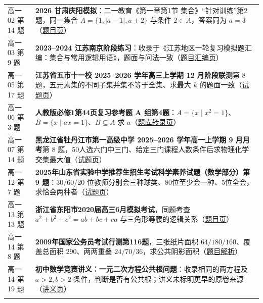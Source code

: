 \documentclass[a4paper,11pt]{article}
\begin{document}
\begin{xltabular}{\textwidth}{@{}>{\raggedright\arraybackslash}p{6.55cm}>{\raggedright\arraybackslash}p{8.60cm}@{}}
高一02 第 14 题 & \textbf{2026 甘肃庆阳模拟}：二一教育《第一章第1节 集合》``针对训练''第2题，同一集合 \(A=\allowbreak \{1,\allowbreak \lvert a-1\rvert,a+\allowbreak 2\}\) 与条件 \(2\in A\)，答案同为 \(a=\allowbreak 3\)（\href{https://zy.21cnjy.com/26331932}{题目页}） \\ \addlinespace[1pt]
高一03 第 9 题 & \textbf{2023--2024 江苏南京阶段练习}：收录于《江苏地区一轮复习模拟题汇编：集合与常用逻辑用语》，题面与问法一致（\href{https://wenku.baidu.com/view/8a489f9272eeaeaad1f34693daef5ef7ba0d12a7.html}{题目汇编页}） \\ \addlinespace[1pt]
高一05 第 17 题 & \textbf{江苏省五市十一校 2025--2026 学年高三上学期 12 月阶段联测}第 8 题，五元素集的不同子集并集不等于全集、求最大 \(k\) 的题面一致（\href{https://www.zxxk.com/soft/55509852.html}{试题页}） \\ \addlinespace[1pt]
高一06 第 3 题 & \textbf{人教版必修1第44页复习参考题 A 组第4题}：\(A=\allowbreak \{x\mid\allowbreak  x^2=\allowbreak 1\}\)、\(B=\allowbreak \{x\mid\allowbreak  ax=\allowbreak 1\}\)、\(B\subseteq\allowbreak  A\) 求 \(a\)（\href{https://easylearn.baidu.com/edu-page/tiangong/questiondetail?id=1721456871855136287}{题库转录页}） \\ \addlinespace[1pt]
高一07 第 14 题 & \textbf{黑龙江省牡丹江市第一高级中学 2025--2026 学年高一上学期 9 月月考}第 8 题，50人选六门中三门、给定三门课程人数条件后求物理化学交集最大值（\href{https://zy.21cnjy.com/23974770}{试题页}） \\ \addlinespace[1pt]
高一12 第 7 题 & \textbf{2025年山东省实验中学推荐生招生考试科学素养试题（数学部分）第 9 题}：30/60/20 位教师分别会三种球类、80位至少会一种、5位全会，求恰会两种者（\href{https://zujuan.xkw.com/11p3421572.html}{试题页}） \\ \addlinespace[1pt]
高一13 第 13 题 & \textbf{浙江省东阳市2020届高三6月模拟考试}，同题考查 \(a^2+b^2+c^2=ab+bc+ca\) 与三角形等腰的逻辑关系（\href{https://easylearn.baidu.com/edu-page/tiangong/questiondetail?id=1726865328494899241}{题目页}） \\ \addlinespace[1pt]
高一14 第 8 题 & \textbf{2009年国家公务员考试行测第116题}，三张纸片面积 \(64/180/160\)、覆盖总面积 \(290\)、两两重叠 \(24/70/36\)，求公共阴影面积（\href{https://m.shenzhen.huatu.com/tiku/2520837.html}{题目解析}） \\ \addlinespace[1pt]
高一14 第 19 题 & \textbf{初中数学竞赛讲义：一元二次方程公共根问题}：收录相同的两方程及 \(a>2,b>2\) 条件，判断是否有公共根；讲义未标明更早的原卷来源（\href{https://wenku.baidu.com/view/c0d5186602d8ce2f0066f5335a8102d276a26191.html}{讲义页}） \\ \addlinespace[1pt]

\end{xltabular}
\end{document}
